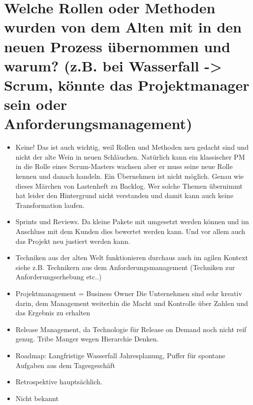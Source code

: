 \section*{Welche Rollen oder Methoden wurden von dem Alten mit in den neuen Prozess übernommen und warum? (z.B. bei Wasserfall -> Scrum, könnte das Projektmanager sein oder Anforderungsmanagement)}
\begin{itemize}
    \item[\openresponse] Keine! Das ist auch wichtig, weil Rollen und Methoden neu gedacht sind und nicht der alte Wein in neuen Schläuchen. Natürlich kann ein klassischer PM in die Rolle eines Scrum-Masters wachsen aber er muss seine neue Rolle kennen und danach handeln. Ein Übernehmen ist nicht möglich. Genau wie dieses Märchen von Lastenheft zu Backlog. Wer solche Themen übernimmt hat leider den Hintergrund nicht verstanden und damit kann auch keine Transformation laufen.
    \item[\openresponse] Sprints und Reviews. Da kleine Pakete mit umgesetzt werden können und im Anschluss mit dem Kunden dies bewertet werden kann. Und vor allem auch das Projekt neu justiert werden kann.
    \item[\openresponse] Techniken aus der alten Welt funktionieren durchaus auch im agilen Kontext siehe z.B. Technikern aus dem Anforderungsmanagement (Techniken zur Anforderungserhebung etc..)
    \item[\openresponse] Projektmanagement = Business Owner Die Unternehmen sind sehr kreativ darin, dem Management weiterhin die Macht und Kontrolle über Zahlen und das Ergebnis zu erhalten
    \item[\openresponse] Release Management, da Technologie für Release on Demand noch nicht reif genug. Tribe Manger wegen Hierarchie Denken.
    \item[\openresponse] Roadmap: Langfristige Wasserfall Jahresplanung, Puffer für spontane Aufgaben aus dem Tagesgeschäft
    \item[\openresponse] Retrospektive hauptsächlich.
    \item[\openresponse] Nicht bekannt
\end{itemize}

